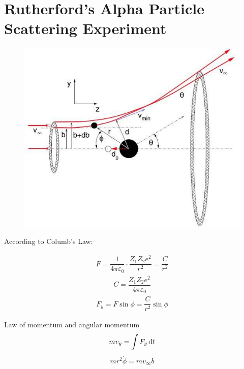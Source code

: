 
\chapter{Rutherford's Alpha Particle Scattering Experiment}

\begin{figure}[H]
  \centering
  \includegraphics[width=0.5\linewidth]{figures/Rutherford}
  \label{fig:}
\end{figure}

According to Columb's Law:

\begin{equation*}
  \begin{aligned}
    F = \dfrac{1}{4 \pi \varepsilon_0} \cdot \dfrac{Z_1 Z_2 e^2}{r^2} = \dfrac{C}{r^2}
  \end{aligned}
\end{equation*}
\begin{equation*}
  \begin{aligned}
    C = \dfrac{Z_1 Z_2 e^2}{4 \pi \varepsilon_0} 
  \end{aligned}
\end{equation*}
\begin{equation*}
  \begin{aligned}
    F_y = F \sin \phi = \dfrac{C}{r^2} \sin \phi 
  \end{aligned}
\end{equation*}

Law of momentum and angular momentum
\begin{equation*}
  \begin{aligned}
    m v_y = \int F_y \mathop{}\!\mathrm{d} t
  \end{aligned}
\end{equation*}
\begin{equation*}
  \begin{aligned}
    m r^2 \dot{\phi} = m v_{\infty} b
  \end{aligned}
\end{equation*}


